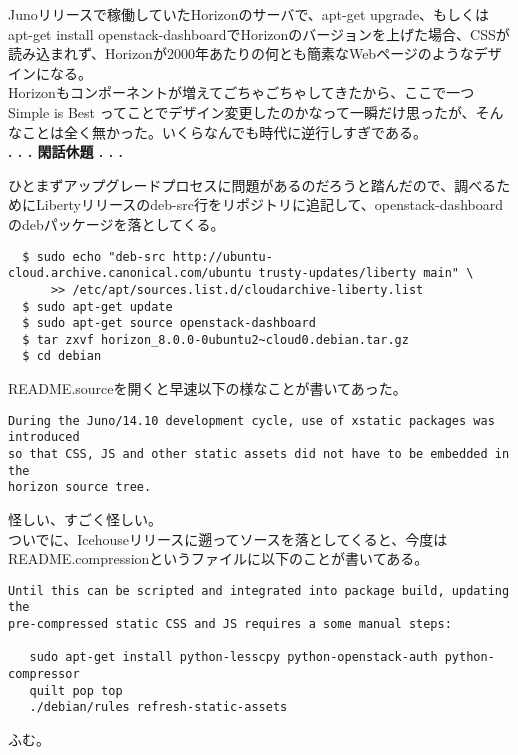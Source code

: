 \documentclass[9pt,b5paper,tombo,openany]{jsbook}
\begin{document}
Junoリリースで稼働していたHorizonのサーバで、apt-get upgrade、もしくはapt-get install openstack-dashboardでHorizonのバージョンを上げた場合、CSSが読み込まれず、Horizonが2000年あたりの何とも簡素なWebページのようなデザインになる。\\[1ex]

Horizonもコンポーネントが増えてごちゃごちゃしてきたから、ここで一つ Simple is Best ってことでデザイン変更したのかなって一瞬だけ思ったが、そんなことは全く無かった。いくらなんでも時代に逆行しすぎである。\\[1ex]

\noindent
\textbf{. . . 閑話休題 . . .}

ひとまずアップグレードプロセスに問題があるのだろうと踏んだので、調べるためにLibertyリリースのdeb-src行をリポジトリに追記して、openstack-dashboardのdebパッケージを落としてくる。

\begin{lstlisting}
  $ sudo echo "deb-src http://ubuntu-cloud.archive.canonical.com/ubuntu trusty-updates/liberty main" \
      >> /etc/apt/sources.list.d/cloudarchive-liberty.list
  $ sudo apt-get update
  $ sudo apt-get source openstack-dashboard
  $ tar zxvf horizon_8.0.0-0ubuntu2~cloud0.debian.tar.gz
  $ cd debian
\end{lstlisting}

\noindent
README.sourceを開くと早速以下の様なことが書いてあった。

\begin{lstlisting}
During the Juno/14.10 development cycle, use of xstatic packages was introduced
so that CSS, JS and other static assets did not have to be embedded in the
horizon source tree.
\end{lstlisting}

\noindent
怪しい、すごく怪しい。\\[1ex]

ついでに、Icehouseリリースに遡ってソースを落としてくると、今度はREADME.compressionというファイルに以下のことが書いてある。

\begin{lstlisting}
Until this can be scripted and integrated into package build, updating the
pre-compressed static CSS and JS requires a some manual steps:

   sudo apt-get install python-lesscpy python-openstack-auth python-compressor
   quilt pop top
   ./debian/rules refresh-static-assets
\end{lstlisting}

\noindent
ふむ。\\[1ex]
\end{document}
